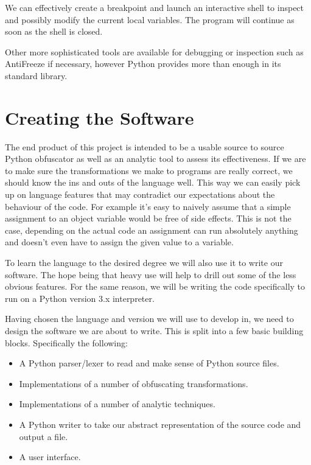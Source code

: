\documentclass{report}
\begin{document}


We can effectively create a breakpoint and launch an interactive shell to inspect and possibly modify the current local
variables. The program will continue as soon as the shell is closed.

Other more sophisticated tools are available for debugging or inspection such as AntiFreeze \cite{pirates} if necessary,
however Python provides more than enough in its standard library.

\section{Creating the Software}

The end product of this project is intended to be a usable source to source Python obfuscator as well as an analytic tool
to assess its effectiveness. If we are to make sure the transformations we make to programs are really correct, we should
know the ins and outs of the language well. This way we can easily pick up on language features that may contradict our
expectations about the behaviour of the code. For example it's easy to naively assume that a simple assignment to an object
variable would be free of side effects. This is not the case, depending on the actual code an assignment can run absolutely
anything \cite{pyprop} and doesn't even have to assign the given value to a variable.

To learn the language to the desired degree we will also use it to write our software. The hope being that heavy use will help to
drill out some of the less obvious features. For the same reason, we will be writing the code specifically to run on a Python version 3.x
interpreter.

Having chosen the language and version we will use to develop in, we need to design the software we are about to write. This is split into a few basic building
blocks. Specifically the following:

\begin{itemize}
\item A Python parser/lexer to read and make sense of Python source files.
\item Implementations of a number of obfuscating transformations.
\item Implementations of a number of analytic techniques.
\item A Python writer to take our abstract representation of the source code and output a file.
\item A user interface.
\end{itemize}
\end{document}
